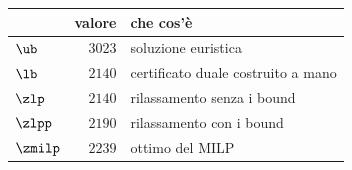 \begin{center}\small
\begin{tabular}{lrl}
\toprule
 & valore & che cos'è \\
\midrule
$\ub$ & $3023$ & soluzione euristica \\
$\lb$ & $2140$ & certificato duale costruito a mano \\
$\zlp$ & $2140$ & rilassamento senza i bound \\
$\zlpp$ & $2190$ & rilassamento con i bound \\
$\zmilp$ & $2239$ & ottimo del MILP \\
\bottomrule
\end{tabular}
\end{center}
